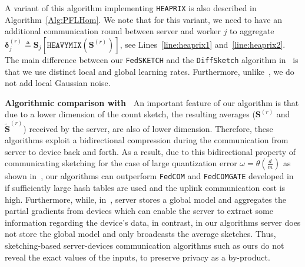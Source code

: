 \documentclass{article}
\begin{document}
A variant of this algorithm implementing \texttt{HEAPRIX} is also described in Algorithm~\ref{Alg:PFLHom}. 
We note that for this variant, we need to have an additional communication round between server and worker $j$ to aggregate $\mathbf{\delta}_j^{(r)}\triangleq \mathbf{S}_j\left[\texttt{HEAVYMIX}(\mathbf{S}^{(r)})\right]$, see Lines~\ref{line:heaprix1} and~\ref{line:heaprix2}. The main difference between our \texttt{FedSKETCH} and the \texttt{DiffSketch} algorithm in~\citet{li2019privacy} is that we use distinct local and global learning rates. Furthermore, unlike~\citet{li2019privacy}, we do not add local Gaussian noise. 

\noindent\textbf{Algorithmic comparison  with~\citet{haddadpour2020federated}}
An important feature of our algorithm is that due to a lower dimension of the count sketch, the resulting averages ($\mathbf{S}^{(r)}$ and  $\tilde{\mathbf{S}}^{(r)}$) received by the server, are also of lower dimension. 
Therefore, these algorithms exploit a bidirectional compression during the communication from server to device back and forth. 
As a result, due to this bidirectional property of communicating sketching for the case of large quantization error $\omega=\theta(\frac{d}{m})$ as shown in~\citet{haddadpour2020federated}, our algorithms can outperform \texttt{FedCOM} and \texttt{FedCOMGATE} developed in~\citet{haddadpour2020federated} if sufficiently large hash tables are used and the uplink communication cost is high. 
Furthermore, while, in~\citet{haddadpour2020federated}, server stores a global model and aggregates the partial gradients from devices which can enable the server to extract some information regarding the device's data, in contrast, in our algorithms server does not store the global model and only broadcasts the average sketches. 
Thus, sketching-based server-devices communication algorithms such as ours do not reveal the exact values of the inputs, to preserve privacy as a by-product.
\end{document}
